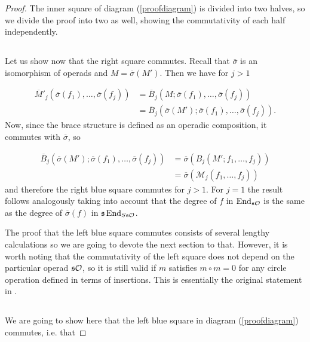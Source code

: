 \documentclass[Thesis.tex]{subfiles}
\begin{document}
\begin{proof}
 The inner square of diagram (\ref{proofdiagram}) is divided into two halves, so we divide the proof into two as well, showing the commutativity of each half independently.
 
\subsection*{}

 Let us show now that the right square commutes. Recall that $\overline{\sigma}$ is an isomorphism of operads and $M=\overline{\sigma}(M')$. Then we have for $j>1$
 
 \begin{align*}
 \overline{M}'_j(\overline{\sigma}(f_1),\dots,\overline{\sigma}(f_j))&=\overline{B}_j(M;\overline{\sigma}(f_1),\dots,\overline{\sigma}(f_j))\\
 &=\overline{B}_j(\overline{\sigma}(M');\overline{\sigma}(f_1),\dots,\overline{\sigma}(f_j)).
 \end{align*}
 Now, since the brace structure is defined as an operadic composition, it commutes with $\overline{\sigma}$, so
 
 \begin{align*}
 \overline{B}_j(\overline{\sigma}(M');\overline{\sigma}(f_1),\dots,\overline{\sigma}(f_j))&=\overline{\sigma}(B_j(M';f_1,\dots, f_j))\\
&=\overline{\sigma}(\mathcal{M}_j(f_1,\dots, f_j))
  \end{align*}
 and therefore the right blue square commutes for $j>1$. For $j=1$ the result follows analogously taking into account that the degree of $f$ in $\operatorname{End}_{\mathfrak{s}{\mathcal O}}$ is the same as the degree of $\overline{\sigma}(f)$ in $\mathfrak{s}\operatorname{End}_{S\mathfrak{s}{\mathcal O}}$.
 

The proof that the left blue square commutes consists of several lengthy calculations so we are going to devote the next section to that. However, it is worth noting that the commutativity of the left square does not depend on the particular operad $\mathfrak{s}{\mathcal O}$, so it is still valid if $m$ satisfies $m\circ m=0$ for any circle operation defined in terms of insertions. This is essentially the original statement in \cite{GV}.
\subsection*{}
We are going to show here that the left blue square in diagram (\ref{proofdiagram}) commutes, i.e. that 


\end{proof}
\end{document}
